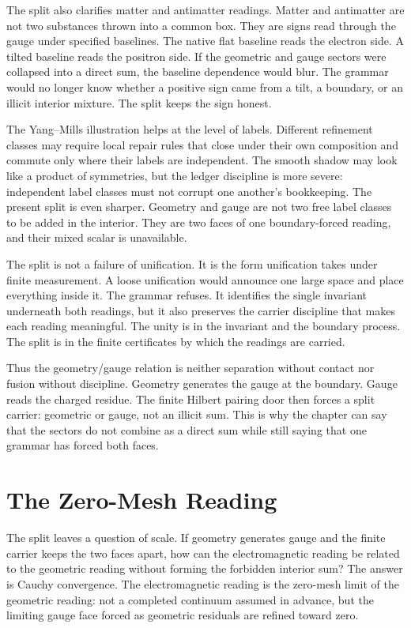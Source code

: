 The split also clarifies matter and antimatter readings. Matter and
antimatter are not two substances thrown into a common box. They are signs
read through the gauge under specified baselines. The native flat baseline
reads the electron side. A tilted baseline reads the positron side. If the
geometric and gauge sectors were collapsed into a direct sum, the baseline
dependence would blur. The grammar would no longer know whether a positive
sign came from a tilt, a boundary, or an illicit interior mixture. The split
keeps the sign honest.

The Yang--Mills illustration helps at the level of labels. Different
refinement classes may require local repair rules that close under their own
composition and commute only where their labels are independent. The smooth
shadow may look like a product of symmetries, but the ledger discipline is
more severe: independent label classes must not corrupt one another's
bookkeeping. The present split is even sharper. Geometry and gauge are not
two free label classes to be added in the interior. They are two faces of one
boundary-forced reading, and their mixed scalar is unavailable.

The split is not a failure of unification. It is the form unification takes
under finite measurement. A loose unification would announce one large space
and place everything inside it. The grammar refuses. It identifies the
single invariant underneath both readings, but it also preserves the carrier
discipline that makes each reading meaningful. The unity is in the invariant
and the boundary process. The split is in the finite certificates by which
the readings are carried.

Thus the geometry/gauge relation is neither separation without contact nor
fusion without discipline. Geometry generates the gauge at the boundary.
Gauge reads the charged residue. The finite Hilbert pairing door then forces
a split carrier: geometric or gauge, not an illicit sum. This is why the
chapter can say that the sectors do not combine as a direct sum while still
saying that one grammar has forced both faces.

\section{The Zero-Mesh Reading}

The split leaves a question of scale. If geometry generates gauge and the
finite carrier keeps the two faces apart, how can the electromagnetic
reading be related to the geometric reading without forming the forbidden
interior sum? The answer is Cauchy convergence. The electromagnetic reading
is the zero-mesh limit of the geometric reading: not a completed continuum
assumed in advance, but the limiting gauge face forced as geometric
residuals are refined toward zero.

